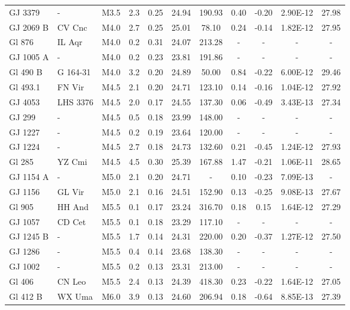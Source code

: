 \begin{landscape}
\begin{center}
\begin{longtable}{l l l c c c c c c c c}
GJ 3379	     &  -	   & M3.5 &  2.3	& 0.25 &	24.94 &	190.93 & 0.40 &	-0.20 &	2.90E-12 &	27.98 \\
GJ 2069 B    & 	CV Cnc & M4.0 &  2.7	& 0.25 &	25.01 &	78.10  & 0.24 &	-0.14 &	1.82E-12 &	27.95 \\
Gl 876	     &  IL Aqr & M4.0 &  0.2	& 0.31 &	24.07 &	213.28 & -	  &   -	  &   -	     &    -   \\
GJ 1005 A    & 	-	   & M4.0 &  0.2	& 0.23 &	23.81 &	191.86 & -	  &   -	  &   -	     &    -   \\
Gl 490 B	 &G 164-31 & M4.0 &  3.2	& 0.20 &	24.89 &	50.00  & 0.84 &	-0.22 &	6.00E-12 &	29.46 \\
Gl 493.1	 &  FN Vir & M4.5 &  2.1	& 0.20 &	24.71 &	123.10 & 0.14 &	-0.16 &	1.04E-12 &	27.92 \\
GJ 4053	     &LHS 3376 & M4.5 &  2.0	& 0.17 &	24.55 &	137.30 & 0.06 &	-0.49 &	3.43E-13 &	27.34 \\
GJ 299	     &  -	   & M4.5 &  0.5	& 0.18 &	23.99 &	148.00 & -	  &   -	  &   -	     &    -   \\
GJ 1227	     &  -	   & M4.5 &  0.2	& 0.19 &	23.64 &	120.00 & -	  &   -	  &   -	     &    -   \\
GJ 1224	     &  -	   & M4.5 &  2.7	& 0.18 &	24.73 &	132.60 & 0.21 &	-0.45 &	1.24E-12 &	27.93 \\
Gl 285	     &  YZ Cmi & M4.5 &  4.5	& 0.30 &	25.39 &	167.88 & 1.47 &	-0.21 &	1.06E-11 &	28.65 \\
GJ 1154 A    & 	-	   & M5.0 &  2.1	& 0.20 &	24.71 &	-	   & 0.10 &	-0.23 &	7.09E-13 &    -   \\
GJ 1156	     &  GL Vir & M5.0 &  2.1	& 0.16 &	24.51 &	152.90 & 0.13 &	-0.25 &	9.08E-13 &	27.67 \\
Gl 905	     &  HH And & M5.5 &  0.1	& 0.17 &	23.24 &	316.70 & 0.18 &	0.15  & 1.64E-12 &	27.29 \\
GJ 1057	     &  CD Cet & M5.5 &  0.1	& 0.18 &	23.29 &	117.10 & -	  &   -	  &   -	     &    -   \\
GJ 1245 B    & 	-	   & M5.5 &  1.7	& 0.14 &	24.31 &	220.00 & 0.20 &	-0.37 &	1.27E-12 &	27.50 \\
GJ 1286	     &  -	   & M5.5 &  0.4	& 0.14 &	23.68 &	138.30 & -	  &   -	  &   -	     &    -   \\
GJ 1002	     &  -	   & M5.5 &  0.2	& 0.13 &	23.31 &	213.00 & -	  &   -	  &   -	     &    -   \\
Gl 406	     & CN Leo  & M5.5 &  2.4	& 0.13 &	24.39 &	418.30 & 0.23 &	-0.22 &	1.64E-12 &	27.05 \\
Gl 412 B	 &  WX Uma & M6.0 &  3.9	& 0.13 &	24.60 &	206.94 & 0.18 &	-0.64 &	8.85E-13 &	27.39 \\

\end{longtable}
\end{center}
\end{landscape}
